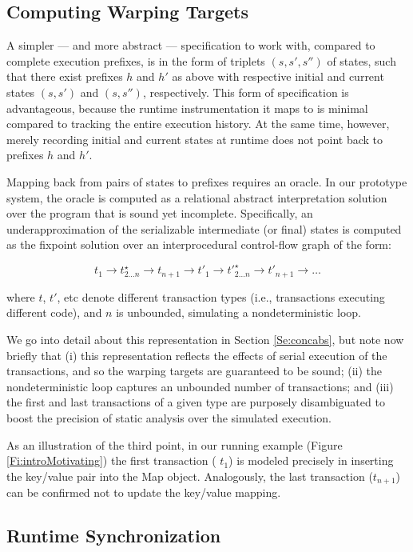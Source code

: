 \subsection{Computing Warping Targets}

A simpler --- and more abstract --- specification to work with, compared to complete execution prefixes, is in the form of triplets $(s,s',s'')$ of states, such that there exist prefixes $h$ and $h'$ as above with respective initial and current states $(s,s')$ and $(s,s'')$, respectively. This form of specification is advantageous, because the runtime instrumentation it maps to is minimal compared to tracking the entire execution history. At the same time, however, merely recording initial and current states at runtime does not point back to prefixes $h$ and $h'$.

Mapping back from pairs of states to prefixes requires an oracle. In our prototype system, the oracle is computed as a relational abstract interpretation solution over the program that is sound yet incomplete. Specifically, an underapproximation of the serializable intermediate (or final) states is computed as the fixpoint solution over an interprocedural control-flow graph of the form: 
\begin{center}
$$
	t_1 \rightarrow t^\star_{2 \ldots n} \rightarrow t_{n+1} \rightarrow t'_1 \rightarrow t'^\star_{2 \ldots n} \rightarrow t'_{n+1} \rightarrow \ldots
$$
\end{center}
where $t$, $t'$, etc denote different transaction types (i.e., transactions executing different code), and $n$ is unbounded, simulating a nondeterministic loop. 

We go into detail about this representation in Section \ref{Se:concabs}, but note now briefly that (i) this representation reflects the effects of serial execution of the transactions, and so the warping targets are guaranteed to be sound; (ii) the nondeterministic loop captures an unbounded number of transactions; and (iii) the first and last transactions of a given type are purposely disambiguated to boost the precision of static analysis over the simulated execution.

As an illustration of the third point, in our running example (Figure \ref{Fi:introMotivating}) the first transaction ( $t_1$) is modeled precisely in inserting the key/value pair into the {\sf Map} object. Analogously, the last transaction ($t_{n+1}$) can be confirmed not to update the key/value mapping.

\subsection{Runtime Synchronization} 

